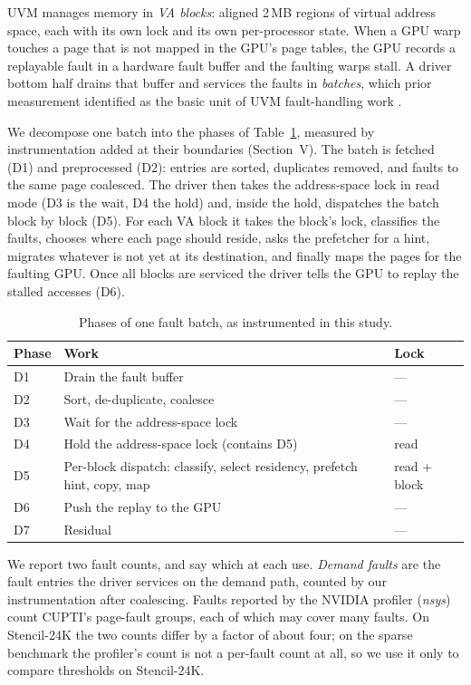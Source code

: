 UVM manages memory in \emph{VA blocks}: aligned 2\,MB regions of virtual
address space, each with its own lock and its own per-processor state. When a
GPU warp touches a page that is not mapped in the GPU's page tables, the GPU
records a replayable fault in a hardware fault buffer and the faulting warps
stall. A driver bottom half drains that buffer and services the faults in
\emph{batches}, which prior measurement identified as the basic unit of UVM
fault-handling work \cite{allen2021indepth,allen2024finegrain}.

We decompose one batch into the phases of Table~\ref{tab:phases}, measured by
instrumentation added at their boundaries (Section~V). The batch is fetched
(D1) and preprocessed (D2): entries are sorted, duplicates removed, and faults
to the same page coalesced. The driver then takes the address-space lock in
read mode (D3 is the wait, D4 the hold) and, inside the hold, dispatches the
batch block by block (D5). For each VA block it takes the block's lock,
classifies the faults, chooses where each page should reside, asks the
prefetcher for a hint, migrates whatever is not yet at its destination, and
finally maps the pages for the faulting GPU. Once all blocks are serviced the
driver tells the GPU to replay the stalled accesses (D6).

\begin{table}[t]
\centering
\footnotesize
\setlength{\tabcolsep}{4pt}
\begin{tabular}{@{}l p{} l@{}}
\toprule
\textbf{Phase} & \textbf{Work} & \textbf{Lock} \\
\midrule
D1 & Drain the fault buffer & --- \\
D2 & Sort, de-duplicate, coalesce & --- \\
D3 & Wait for the address-space lock & --- \\
D4 & Hold the address-space lock (contains D5) & read \\
D5 & Per-block dispatch: classify, select residency, prefetch hint,
     copy, map & read + block \\
D6 & Push the replay to the GPU & --- \\
D7 & Residual & --- \\
\bottomrule
\end{tabular}
\caption{Phases of one fault batch, as instrumented in this study.}
\label{tab:phases}
\end{table}

We report two fault counts, and say which at each use. \emph{Demand faults}
are the fault entries the driver services on the demand path, counted by our
instrumentation after coalescing. Faults reported by the NVIDIA profiler
(\emph{nsys}) count CUPTI's page-fault groups, each of which may cover many
faults. On Stencil-24K the two counts differ by a factor of about four; on the
sparse benchmark the profiler's count is not a per-fault count at all, so we use
it only to compare thresholds on Stencil-24K.

